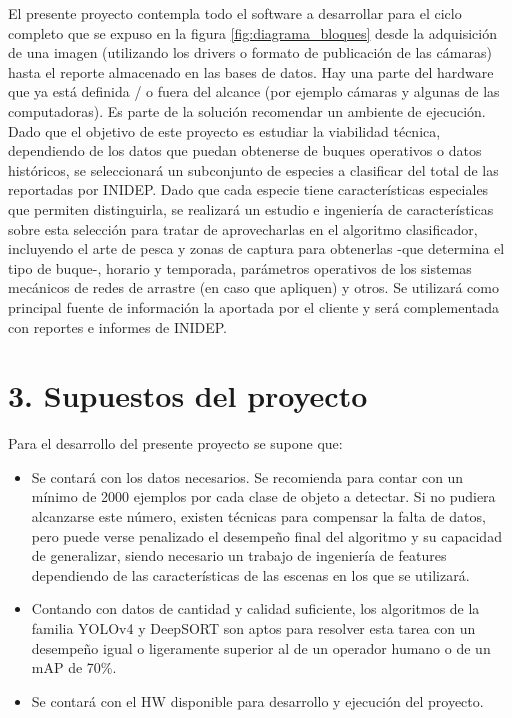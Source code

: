\documentclass[11pt]{charter}
\begin{document}
El presente proyecto contempla todo el software a desarrollar para el ciclo completo que se expuso en la figura \ref{fig:diagrama_bloques} desde la adquisición de una imagen (utilizando los drivers o formato de publicación de las cámaras) hasta el reporte almacenado en las bases de datos. Hay una parte del hardware que ya está definida / o fuera del alcance (por ejemplo cámaras y algunas de las computadoras). Es parte de la solución recomendar un ambiente de ejecución.
Dado que el objetivo de este proyecto es estudiar la viabilidad técnica, dependiendo de los datos que puedan obtenerse de buques operativos o datos históricos, se seleccionará un subconjunto de especies a clasificar del total de las reportadas por INIDEP. Dado que cada especie tiene características especiales que permiten distinguirla, se realizará un estudio e ingeniería de características sobre esta selección para tratar de aprovecharlas en el algoritmo clasificador, incluyendo el arte de pesca y zonas de captura para obtenerlas -que determina el tipo de buque-, horario y temporada, parámetros operativos de los sistemas mecánicos de redes de arrastre (en caso que apliquen) y otros. Se utilizará como principal fuente de información la aportada por el cliente y será complementada con reportes e informes de INIDEP. 


\section{3. Supuestos del proyecto}
\label{sec:supuestos}

Para el desarrollo del presente proyecto se supone que:

\begin{itemize}
\item Se contará con los datos necesarios. Se recomienda para contar con un mínimo de 2000 ejemplos por cada clase de objeto a detectar. Si no pudiera alcanzarse este número, existen técnicas para compensar la falta de datos, pero puede verse penalizado el desempeño final del algoritmo y su capacidad de generalizar, siendo necesario un trabajo de ingeniería de features dependiendo de las características de las escenas en los que se utilizará.
\item Contando con datos de cantidad y calidad suficiente, los algoritmos de la familia YOLOv4 y DeepSORT son aptos para resolver esta tarea con un desempeño igual o ligeramente superior al de un operador humano o de un mAP de 70\%.
\item Se contará con el HW disponible para desarrollo y ejecución del proyecto.
\end{itemize}
\end{document}
